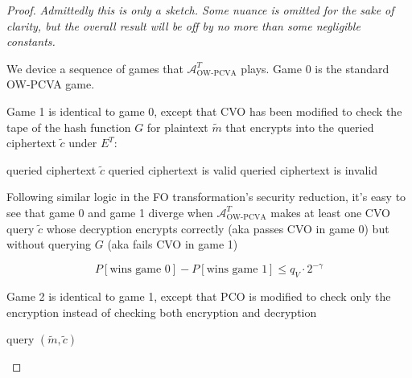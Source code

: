 \documentclass{article}
\begin{document}
\begin{proof}\label{cpa-to-pcva-proof}
    \textit{Admittedly this is only a sketch. Some nuance is omitted for the sake of clarity, but the overall result will be off by no more than some negligible constants.}

    We device a sequence of games that $\mathcal{A}^T_\text{OW-PCVA}$ plays. Game 0 is the standard OW-PCVA game.

    Game 1 is identical to game 0, except that CVO has been modified to check the tape of the hash function $G$ for plaintext $\tilde{m}$ that encrypts into the queried ciphertext $\tilde{c}$ under $E^T$:

    \begin{algorithm}\label{cvo-1}
        \caption{$\text{CVO}_1$}
        \begin{algorithmic}[1]
            \Require queried ciphertext $\tilde{c}$
                    \State {}  \Comment queried ciphertext is valid
                \EndIf
            \EndFor
            \State {}  \Comment queried ciphertext is invalid
        \end{algorithmic}
    \end{algorithm}

    Following similar logic in the FO transformation's security reduction, it's easy to see that game 0 and game 1 diverge when $\mathcal{A}^T_\text{OW-PCVA}$ makes at least one CVO query $\tilde{c}$ whose decryption encrypts correctly (aka passes CVO in game 0) but without querying $G$ (aka fails CVO in game 1)

    \begin{equation}\label{ow-pcva-g0-g1}
        P[\text{wins game 0}] - P[\text{wins game 1}] \leq q_V \cdot 2^{-\gamma}
    \end{equation}

    Game 2 is identical to game 1, except that PCO is modified to check only the encryption instead of checking both encryption and decryption

    \begin{algorithm}
        \caption{$\text{PCO}_2$}
        \begin{algorithmic}[1]
            \Require query $(\tilde{m}, \tilde{c})$
                    \State {}
                \EndIf
            \EndFor
            \State {}
        \end{algorithmic}
    \end{algorithm}\pagebreak


\end{proof}
\end{document}
